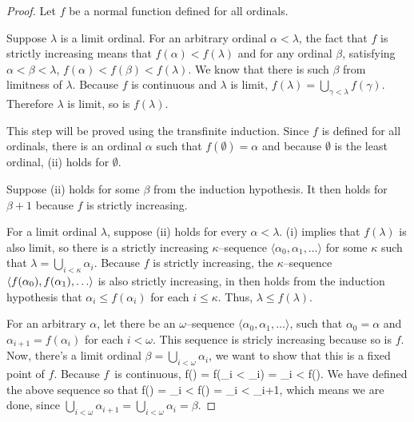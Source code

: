 \begin{proof}
Let $f$ be a normal function defined for all ordinals.
\bce[(i)]
\item
Suppose $\lambda$ is a limit ordinal. 
For an arbitrary ordinal $\alpha < \lambda$, the fact that $f$ is strictly increasing means that $f(\alpha) < f(\lambda)$ and for any ordinal $\beta$, 
satisfying $\alpha < \beta < \lambda$, $f(\alpha) < f(\beta) < f(\lambda)$. 
We know that there is such $\beta$ from limitness of $\lambda$.
Because $f$ is continuous and $\lambda$ is limit, $f(\lambda) = \bigcup_{\gamma < \lambda} f(\gamma)$.%
Therefore $\lambda$ is limit, so is $f(\lambda)$.

\item This step will be proved using the transfinite induction.
Since $f$ is defined for all ordinals, there is an ordinal $\alpha$ such that $f(\emptyset) = \alpha$ and because $\emptyset$ is the least ordinal, (ii) holds for $\emptyset$.

Suppose (ii) holds for some $\beta$ from the induction hypothesis. It then holds for $\beta+1$ because $f$ is strictly increasing. 

For a limit ordinal $\lambda$, suppose (ii) holds for every $\alpha < \lambda$. (i) implies that $f(\lambda)$ is also limit, 
so there is a strictly increasing $\kappa$–sequence $\langle \alpha_0, \alpha_1, \ldots \rangle$ for some $\kappa$ such that $\lambda = \bigcup_{i<\kappa} \alpha_i$. Because $f$ is strictly increasing, the $\kappa$–sequence $\langle f(\alpha_0), f(\alpha_1), \ldots \rangle$ is also strictly increasing, in then holds from the induction hypothesis that $\alpha_i \leq f(\alpha_i)$ for each $i \leq \kappa$. 
Thus, $\lambda \leq f(\lambda)$.

\item For an arbitrary $\alpha$, let there be an $\omega$–sequence $\langle \alpha_0, \alpha_1, \ldots \rangle$, 
such that $\alpha_0 = \alpha$ and $\alpha_{i+1} = f(\alpha_i)$ for each $i < \omega$.
This sequence is stricly increasing because so is $f$. 
Now, there's a limit ordinal $\beta = \bigcup_{i < \omega} \alpha_i$, we want to show that this is a fixed point of $f$. 
Because $f$~is continuous,
\beq
f(\beta) = f(\bigcup_{i < \omega} \alpha_i) = \bigcup_{i < \omega} f(\alpha)\mbox{.}
\eeq 
We have defined the above sequence so that 
\beq
f(\beta) = \bigcup_{i < \omega} f(\alpha) = \bigcup_{i < \omega} \alpha_{i+1}\mbox{,}
\eeq 
which means we are done, since $\bigcup_{i < \omega} \alpha_{i+1} = \bigcup_{i < \omega} \alpha_{i}  = \beta$.


\end{proof}
